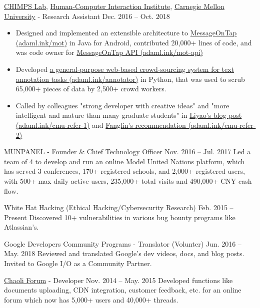 \documentclass[hidelinks__VERSION__]{adamyi-cv}
\begin{document}
\begin{entrylist}


\entry
{\href{http://cmuchimps.org/}{CHIMPS Lab}, \href{https://www.hcii.cmu.edu/}{Human-Computer Interaction Institute}, \href{https://www.cmu.edu/}{Carnegie Mellon University} - Research Assistant}
{Dec. 2016 -- Oct. 2018}
{
\begin{minipage}[t]{1\linewidth}
\begin{itemize}[leftmargin=*,align=left,noitemsep]
\item Designed and implemented an extensible architecture to \href{https://adaml.ink/mot}{MessageOnTap (adaml.ink/mot)} in Java for Android, contributed 20,000+ lines of code, and was code owner for \href{https://adaml.ink/mot-api}{MessageOnTap API (adaml.ink/mot-api)}
\item Developed \href{https://adaml.ink/annotator}{a general-purpose web-based crowd-sourcing system for text annotation tasks (adaml.ink/annotator)} in Python, that was used to scrub 65,000+ pieces of data by 2,500+ crowd workers.
\item Called by colleagues "strong developer with creative ideas" and "more intelligent and mature than many graduate students" in \href{https://adaml.ink/cmu-refer-1}{Liyao's blog post (adaml.ink/cmu-refer-1)} and \href{https://adaml.ink/cmu-refer-2}{Fanglin's recommendation (adaml.ink/cmu-refer-2)}
\end{itemize}
\end{minipage}
}


\entry
{\href{https://www.munpanel.com}{MUNPANEL} - Founder \& Chief Technology Officer}
{Nov. 2016 -- Jul. 2017}
{Led a team of 4 to develop and run an online Model United Nations platform, which has served 3 conferences, 170+ registered schools, and 2,000+ registered users, with 500+ max daily active users, 235,000+ total visits and 490,000+ CNY cash flow.}


\entry
{White Hat Hacking (Ethical Hacking/Cybersecurity Research)}
{Feb. 2015 -- Present}
{Discovered 10+ vulnerabilities in various bug bounty programs like Atlassian's.}


\entry
{Google Developers Community Programs - Translator (Volunter)}
{Jun. 2016 -- May. 2018}
{Reviewed and translated Google's dev videos, docs, and blog posts. Invited to Google I/O as a Community Partner.}


\entry
{\href{https://chaoli.club}{Chaoli Forum} - Developer}
{Nov. 2014 -- May. 2015}
{Developed functions like documents uploading, CDN integration, customer feedback, etc. for an online forum which now has 5,000+ users and 40,000+ threads.}

\end{entrylist}
\end{document}

